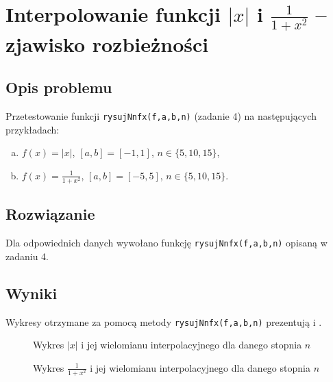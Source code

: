 \documentclass[11pt]{mk-polish-lab-report}
\begin{document}
\section{Interpolowanie funkcji $|x|$ i $\frac{1}{1+x^2}$ -- zjawisko rozbieżności}

\subsection{Opis problemu}
Przetestowanie funkcji \texttt{rysujNnfx(f,a,b,n)} (zadanie 4) na następujących przykładach:
\begin{enumerate}[(a)]
\item $f(x) = |x|$, $[a, b] = [-1,1]$, $n \in \{5,10,15\}$,
\item $f(x) = \frac{1}{1+x^2}$, $[a, b] = [-5,5]$, $n \in \{5,10,15\}$.
\end{enumerate}

\subsection{Rozwiązanie}
Dla odpowiednich danych wywołano funkcję \texttt{rysujNnfx(f,a,b,n)} opisaną w zadaniu 4.

\subsection{Wyniki}
Wykresy otrzymane za pomocą metody \texttt{rysujNnfx(f,a,b,n)} prezentują  i .
		\begin{figure}[h]
			\centering
			 \hfill
			 \hfill
			 \hfill
  			\caption{Wykres $|x|$ i jej wielomianu interpolacyjnego dla danego stopnia $n$}
  			\label{fig:3}
		\end{figure}		
		
		\begin{figure}[h]
			\centering
			 \hfill
			 \hfill
			 \hfill
  			\caption{Wykres $\frac{1}{1+x^2}$ i jej wielomianu interpolacyjnego dla danego stopnia $n$}
  			\label{fig:4}
		\end{figure}	
\end{document}
